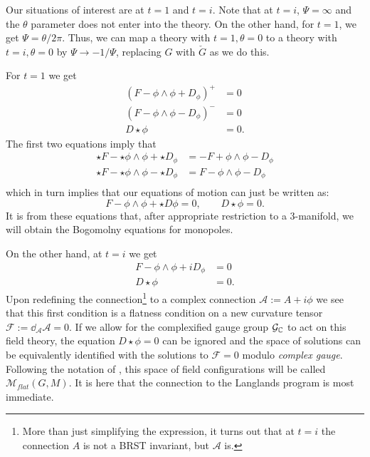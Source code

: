 	Our situations of interest are at $t=1$ and $t=i$. Note that at $t = i$, $\Psi = \infty$ and the $\theta$ parameter does not enter into the theory. On the other hand, for $t = 1$, we get $\Psi = \theta/2\pi$. Thus, we can map a theory with $t=1, \theta=0$ to a theory with $t = i, \theta = 0$ by $\Psi \to -1/\Psi$, replacing $G$ with $\check G$ as we do this.
	
	For $t = 1$ we get
	\begin{equation}\label{eq:ahat}
		\begin{aligned}
			(F - \phi \wedge \phi + D_\phi)^+ &= 0\\
			(F - \phi \wedge \phi - D_\phi)^- &= 0\\
			D \star \phi &= 0.
		\end{aligned}
	\end{equation}
	The first  two equations imply that
	\[
	\begin{aligned}
		\star F - \star \phi \wedge \phi + \star D_\phi &= - F + \phi \wedge \phi - D_\phi\\
		\star F - \star \phi \wedge \phi - \star D_\phi &= F - \phi \wedge \phi - D_\phi\\
	\end{aligned}		
	\]
	which in turn implies that our equations of motion can just be written as:
	\begin{equation}
		F - \phi \wedge \phi + \star D \phi = 0, \qquad D \star \phi = 0.
	\end{equation}
	It is from these equations that, after appropriate restriction to a 3-manifold, we will obtain the Bogomolny equations for monopoles.
	
	
	On the other hand, at $t=i$ we get
	\begin{equation}\label{eq:bhat}
		\begin{aligned}
			F - \phi \wedge \phi + i D_\phi &= 0\\
			D \star \phi &= 0.
		\end{aligned}
	\end{equation}
	Upon redefining the connection\footnote{More than just simplifying the expression, it turns out that at $t=i$ the connection $A$ is not a BRST invariant, but $\mathcal A$ is.} to a complex connection $\mathcal A := A + i \phi$ we see that this first condition is a flatness condition on a new curvature tensor $\mathcal F := \dd_{\mathcal A} \mathcal A = 0$.  If we allow for the complexified gauge group $\mathcal G_{\mathbb{C}}$ to act on this field theory, the equation $D \star \phi = 0$ can be ignored and the space of solutions can be equivalently identified with the solutions to $\mathcal F = 0$ modulo \emph{complex gauge}. Following the notation of \cite{kapustin2008}, this space of field configurations will be called $\mathcal M_{flat}(G, M)$. It is here that the connection to the Langlands program is most immediate.
	
